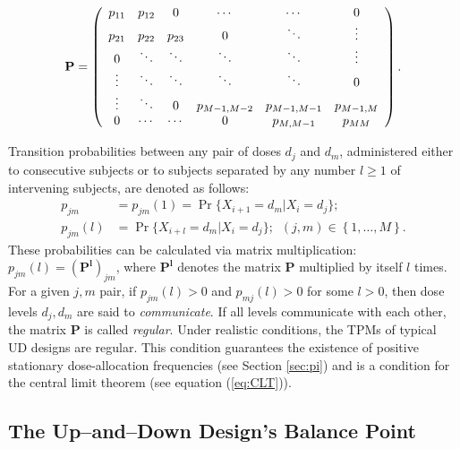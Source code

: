\begin{equation}\label{eq:genericPmat}
\bf{P}=\left(
\begin{array}{cccccc}
  p_{11}& p_{12} & 0 & \cdots & \cdots & 0 \\
  p_{21} & p_{22} & p_{23} & 0 & \ddots & \vdots \\
  0 & \ddots & \ddots & \ddots & \ddots & \vdots \\
  \vdots & \ddots & \ddots & \ddots & \ddots & 0 \\
  \vdots & \ddots & 0 & p_{M-1,M-2} & p_{M-1,M-1} & p_{M-1,M} \\
  0 & \cdots & \cdots & 0 & p_{M,M-1} & p_{MM}\\
\end{array}
\right).
\end{equation}

Transition probabilities between any pair of doses $d_j$ and $d_m$, administered either to consecutive subjects or to subjects separated by any number $l\geq 1$ of intervening subjects, are denoted as follows:
\begin{equation*}
\begin{array}{rl}
p_{jm}&=p_{jm}(1)=\Pr\{X_{i+1}=d_m|X_i=d_j\};\\
p_{jm}(l)&=\Pr\{X_{i+l}=d_m|X_i=d_j\};\,\,\,(j,m)\in\left\{1,\ldots,M\right\}.
\end{array}
\end{equation*}
These probabilities can be calculated via matrix multiplication: $p_{jm}(l)=\left(\mathbf{P^l}\right)_{jm}$, where $\mathbf{P^l}$ denotes the matrix $\mathbf{P}$ multiplied by itself $l$ times. For a given $j,m$ pair, if $p_{jm}(l)>0$ and $p_{mj}(l)>0$  for some $l>0$, then dose levels $d_j,d_m$ are said to \emph{communicate}. If all levels communicate with each other, the matrix $\mathbf{P}$ is called \emph{regular}. Under realistic conditions, the TPMs of typical UD designs are regular.  This condition guarantees the existence of positive stationary dose-allocation frequencies (see Section \ref{sec:pi}) and is a condition for the central limit theorem (see equation (\ref{eq:CLT})).


\subsection{The Up--and--Down Design's Balance Point}\label{sec:balpoint}

